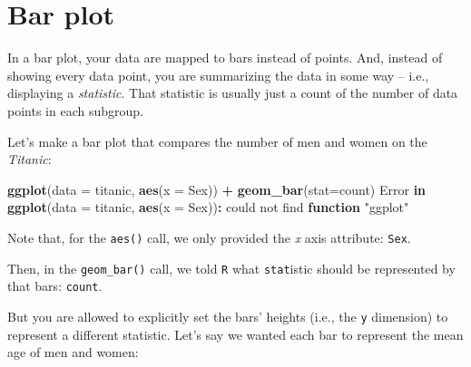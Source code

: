 \documentclass[
]{book}
\newenvironment{Shaded}{\begin{snugshade}}{\end{snugshade}}
\newcommand{\AttributeTok}[1]{\textcolor[rgb]{0.13,0.29,0.53}{#1}}
\newcommand{\ControlFlowTok}[1]{\textcolor[rgb]{0.13,0.29,0.53}{\textbf{#1}}}
\newcommand{\FunctionTok}[1]{\textcolor[rgb]{0.13,0.29,0.53}{\textbf{#1}}}
\newcommand{\NormalTok}[1]{#1}
\newcommand{\SpecialCharTok}[1]{\textcolor[rgb]{0.81,0.36,0.00}{\textbf{#1}}}
\newcommand{\StringTok}[1]{\textcolor[rgb]{0.31,0.60,0.02}{#1}}
\begin{document}
\section*{Bar plot}\label{bar-plot}

In a bar plot, your data are mapped to bars instead of points. And, instead of showing every data point, you are summarizing the data in some way -- i.e., displaying a \emph{statistic}. That statistic is usually just a count of the number of data points in each subgroup.

Let's make a bar plot that compares the number of men and women on the \emph{Titanic}:

\begin{Shaded}
\begin{Highlighting}[]
\FunctionTok{ggplot}\NormalTok{(}\AttributeTok{data =}\NormalTok{ titanic, }
       \FunctionTok{aes}\NormalTok{(}\AttributeTok{x =}\NormalTok{ Sex)) }\SpecialCharTok{+} 
  \FunctionTok{geom\_bar}\NormalTok{(}\AttributeTok{stat=}\StringTok{\textquotesingle{}count\textquotesingle{}}\NormalTok{)}
\NormalTok{Error }\ControlFlowTok{in} \FunctionTok{ggplot}\NormalTok{(}\AttributeTok{data =}\NormalTok{ titanic, }\FunctionTok{aes}\NormalTok{(}\AttributeTok{x =}\NormalTok{ Sex))}\SpecialCharTok{:}\NormalTok{ could not find }\ControlFlowTok{function} \StringTok{"ggplot"}
\end{Highlighting}
\end{Shaded}

Note that, for the \texttt{aes()} call, we only provided the \emph{x} axis attribute: \texttt{Sex}.

Then, in the \texttt{geom\_bar()} call, we told \texttt{R} what \texttt{stat}istic should be represented by that bars: \texttt{\textquotesingle{}count\textquotesingle{}}.

But you are allowed to explicitly set the bars' heights (i.e., the \texttt{y} dimension) to represent a different statistic. Let's say we wanted each bar to represent the mean age of men and women:
\end{document}
